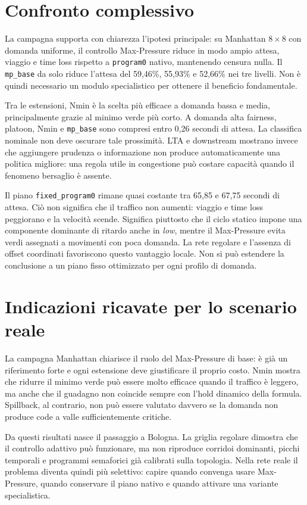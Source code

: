 \documentclass[12pt,a4paper,oneside]{report}
\numberwithin{equation}{chapter}
\begin{document}
\section{Confronto complessivo}

La campagna supporta con chiarezza l'ipotesi principale: su Manhattan
$8\times8$ con domanda uniforme, il controllo Max-Pressure riduce in modo ampio attesa,
viaggio e time loss rispetto a \texttt{program0} nativo, mantenendo censura nulla. Il
\texttt{mp\_base} da solo riduce l'attesa del 59,46\%, 55,93\% e 52,66\% nei
tre livelli. Non è quindi necessario un modulo specialistico per ottenere il
beneficio fondamentale.

Tra le estensioni, Nmin è la scelta più efficace a domanda bassa e media,
principalmente grazie al minimo verde più corto. A domanda alta fairness,
platoon, Nmin e \texttt{mp\_base} sono compresi entro 0,26 secondi di attesa. La classifica
nominale non deve oscurare tale prossimità. LTA e downstream mostrano invece
che aggiungere prudenza o informazione non produce automaticamente una politica
migliore: una regola utile in congestione può costare capacità quando il
fenomeno bersaglio è assente.

Il piano \texttt{fixed\_program0} rimane quasi costante tra 65,85 e 67,75 secondi di attesa. Ciò
non significa che il traffico non aumenti: viaggio e time loss peggiorano e la
velocità scende. Significa piuttosto che il ciclo statico impone una componente dominante
di ritardo anche in \emph{low}, mentre il Max-Pressure evita verdi assegnati a
movimenti con poca domanda. La rete regolare e l'assenza di offset coordinati
favoriscono questo vantaggio locale. Non si può estendere la conclusione a un
piano fisso ottimizzato per ogni profilo di domanda.

\section{Indicazioni ricavate per lo scenario reale}

La campagna Manhattan chiarisce il ruolo del Max-Pressure di base: è già un
riferimento forte e ogni estensione deve giustificare il proprio costo. Nmin
mostra che ridurre il minimo verde può essere molto efficace quando il traffico
è leggero, ma anche che il guadagno non coincide sempre con l'hold dinamico
della formula. Spillback, al contrario, non può essere valutato davvero se la
domanda non produce code a valle sufficientemente critiche.

Da questi risultati nasce il passaggio a Bologna. La griglia regolare dimostra
che il controllo adattivo può funzionare, ma non riproduce corridoi dominanti,
picchi temporali e programmi semaforici già calibrati sulla topologia. Nella
rete reale il problema diventa quindi più selettivo: capire quando convenga
usare Max-Pressure, quando conservare il piano nativo e quando attivare una
variante specialistica.
\end{document}
